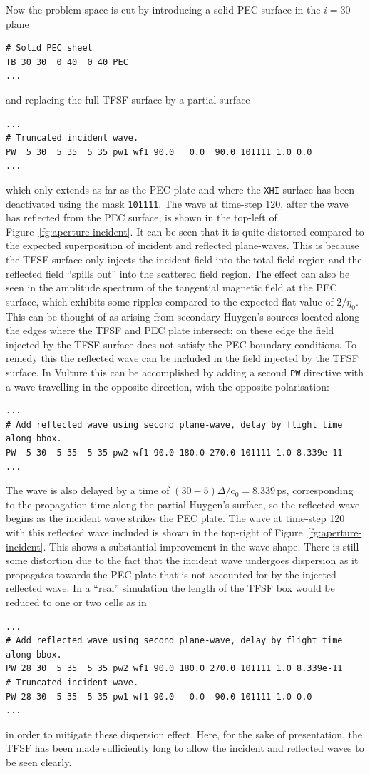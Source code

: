 \documentclass[onecolumn,a4paper]{article}
\numberwithin{equation}{section}
\begin{document}
Now the problem space is cut by introducing a solid PEC surface in the $i=30$ plane
\begin{verbatim}
# Solid PEC sheet
TB 30 30  0 40  0 40 PEC
...
\end{verbatim}
and replacing the full TFSF surface by a partial surface
\begin{verbatim}
...
# Truncated incident wave.
PW  5 30  5 35  5 35 pw1 wf1 90.0   0.0  90.0 101111 1.0 0.0
...
\end{verbatim}
which only extends as far as the PEC plate and where the \texttt{XHI} surface has been deactivated 
using the mask \texttt{101111}. The wave at time-step 120, after the wave has reflected from the PEC surface,
is shown in the top-left of Figure~\ref{fg:aperture-incident}. It can be seen that it is quite distorted compared to
the expected superposition of incident and reflected plane-waves. This is because the TFSF surface only
injects the incident field into the total field region and the reflected field ``spills out'' into the
scattered field region. The effect can also be seen in the amplitude spectrum of the tangential magnetic 
field at the PEC surface, which exhibits some ripples compared to the expected flat value of $2/\eta_0$.
This can be thought of as arising from secondary Huygen's sources located along the edges
where the TFSF and PEC plate intersect; on these edge the field injected by the TFSF surface does not satisfy the
PEC boundary conditions. To remedy this the reflected wave can be included in the field injected by the TFSF surface.
In Vulture this can be accomplished by adding a second \texttt{PW} directive with a wave travelling in the opposite direction, with
the opposite polarisation:
\begin{verbatim}
...
# Add reflected wave using second plane-wave, delay by flight time along bbox.
PW  5 30  5 35  5 35 pw2 wf1 90.0 180.0 270.0 101111 1.0 8.339e-11
...
\end{verbatim}
The wave is also delayed by a time of $(30-5)\Delta /\mathrm{c}_0=8.339$\,ps, corresponding to the propagation time along the
partial Huygen's surface, so the reflected wave begins as the incident wave strikes
the PEC plate. The wave at time-step 120 with this reflected wave included is shown in the top-right 
of Figure~\ref{fg:aperture-incident}. This shows a substantial improvement in the wave shape. There is still some
distortion due to the fact that the incident wave undergoes dispersion as it propagates towards the PEC
plate that is not accounted for by the injected reflected wave. In a ``real'' simulation the length of the TFSF
box would be reduced to one or two cells as in
\begin{verbatim}
...
# Add reflected wave using second plane-wave, delay by flight time along bbox.
PW 28 30  5 35  5 35 pw2 wf1 90.0 180.0 270.0 101111 1.0 8.339e-11
# Truncated incident wave.
PW 28 30  5 35  5 35 pw1 wf1 90.0   0.0  90.0 101111 1.0 0.0
...
\end{verbatim}
in order to mitigate these dispersion effect. Here, for the sake of presentation, the TFSF has been
made sufficiently long to allow the incident and reflected waves to be seen clearly. 
\end{document}
